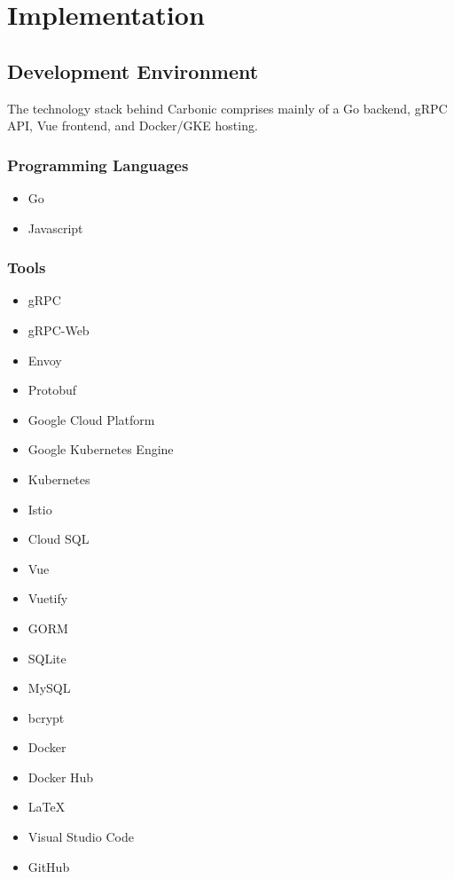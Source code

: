 
\section{Implementation}\label{sec:implementation}
    \subsection{Development Environment}
        The technology stack behind Carbonic comprises mainly of a Go backend, gRPC API, Vue frontend, and Docker/GKE hosting.

        \subsubsection{Programming Languages}
            \begin{itemize}
                \item Go
                \item Javascript
            \end{itemize}

        \subsubsection{Tools}
            \begin{itemize}
                \item gRPC
                \item gRPC-Web
                \item Envoy
                \item Protobuf
                \item Google Cloud Platform
                \item Google Kubernetes Engine
                \item Kubernetes
                \item Istio
                \item Cloud SQL
                \item Vue
                \item Vuetify
                \item GORM
                \item SQLite
                \item MySQL
                \item bcrypt
                \item Docker
                \item Docker Hub
                \item LaTeX
                \item Visual Studio Code
                \item GitHub
            \end{itemize}

